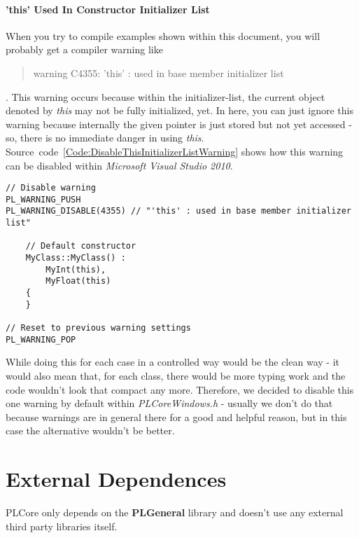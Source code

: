 \paragraph{'this' Used In Constructor Initializer List}
When you try to compile examples shown within this document, you will probably get a compiler warning like \begin{quote}warning C4355: 'this' : used in base member initializer list\end{quote}. This warning occurs because within the initializer-list, the current object denoted by \emph{this} may not be fully initialized, yet. In here, you can just ignore this warning because internally the given pointer is just stored but not yet accessed - so, there is no immediate danger in using \emph{this}. Source~code~\ref{Code:DisableThisInitializerListWarning} shows how this warning can be disabled within \emph{Microsoft Visual Studio 2010}.
\begin{lstlisting}[float=htb,label=Code:DisableThisInitializerListWarning,caption={Disable warning when using \emph{this} within the initializer list}]
// Disable warning
PL_WARNING_PUSH
PL_WARNING_DISABLE(4355) // "'this' : used in base member initializer list"

	// Default constructor
	MyClass::MyClass() :
		MyInt(this),
		MyFloat(this)
	{
	}

// Reset to previous warning settings
PL_WARNING_POP
\end{lstlisting}
While doing this for each case in a controlled way would be the clean way - it would also mean that, for each class, there would be more typing work and the code wouldn't look that compact any more. Therefore, we decided to disable this one warning by default within \emph{PLCoreWindows.h} - usually we don't do that because warnings are in general there for a good and helpful reason, but in this case the alternative wouldn't be better.




\section{External Dependences}
PLCore only depends on the \textbf{PLGeneral} library and doesn't use any external third party libraries itself.

